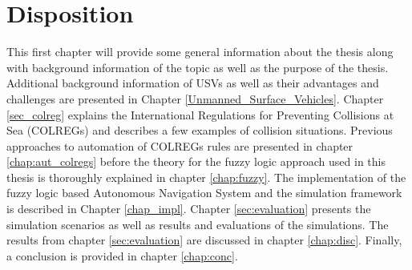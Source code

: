 \section{Disposition}
This first chapter will provide some general information about the thesis along with background information of the topic as well as
the purpose of the thesis. Additional background information of USVs as well as their advantages and challenges are presented in Chapter \ref{Unmanned_Surface_Vehicles}. Chapter \ref{sec_colreg} explains the International Regulations for Preventing Collisions
at Sea (COLREGs) and describes a few examples of collision situations.  Previous approaches to automation of COLREGs rules are presented in chapter \ref{chap:aut_colregs} before the theory for the fuzzy logic approach used in this thesis is thoroughly explained in chapter \ref{chap:fuzzy}. The implementation of the fuzzy logic based Autonomous Navigation System and the simulation framework is described in Chapter \ref{chap_impl}. Chapter \ref{sec:evaluation} presents the simulation scenarios as well as results and evaluations of the simulations. The results from chapter \ref{sec:evaluation} are discussed in chapter \ref{chap:disc}. Finally, a conclusion is provided in chapter \ref{chap:conc}.